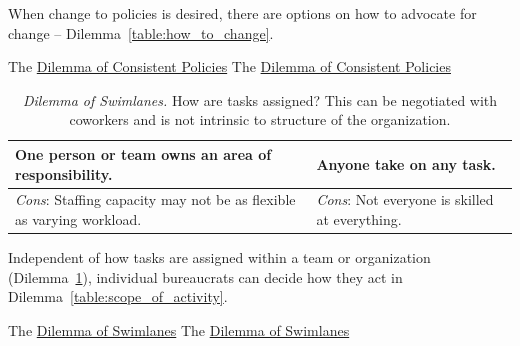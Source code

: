 When change to policies is desired, there are options on how to advocate for change -- Dilemma~\ref{table:how_to_change}.

The \href{table:policy_consistency_across_cases}{Dilemma of Consistent Policies}
The \href{table:policy_consistency_across_cases}{Dilemma of Consistent Policies}


\begin{center}
\begin{table}[H] %
\begin{tabular}{ | m{\dilemmatablewidth}| m{\dilemmatablewidth} | } 
  \hline
  \textbf{One person or team owns an area of responsibility.} & 
  \textbf{Anyone take on any task.} \\ 
  \hline
  \textit{Cons}: Staffing capacity may not be as flexible as varying workload. & 
  \textit{Cons}: Not everyone is skilled at everything. \\  
  \hline
\end{tabular}
\caption{
\textit{Dilemma of Swimlanes.} 
How are tasks assigned? This can be negotiated with coworkers and is not intrinsic to structure of the organization. 
}
\label{table:swimlanes}
\end{table}
\end{center}


Independent of how tasks are assigned within a team or organization (Dilemma~\ref{table:swimlanes}), individual bureaucrats can decide how they act in Dilemma~\ref{table:scope_of_activity}.


The \href{table:swimlanes}{Dilemma of Swimlanes}
The \href{table:swimlanes}{Dilemma of Swimlanes}


